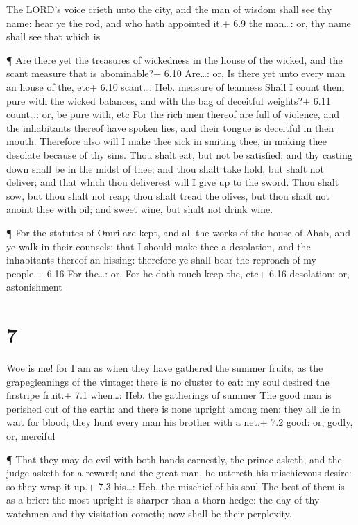  The LORD's voice crieth unto the city, and the man of
wisdom shall see thy name: hear ye the rod, and who hath appointed it.+
6.9 the man\ldots: or, thy name shall see that which is

 ¶ Are there yet the treasures of wickedness in the house
of the wicked, and the scant measure that is abominable?+ 6.10
Are\ldots: or, Is there yet unto every man an house of the, etc+ 6.10
scant\ldots: Heb. measure of leanness  Shall I count them
pure with the wicked balances, and with the bag of deceitful weights?+
6.11 count\ldots: or, be pure with, etc  For the rich men
thereof are full of violence, and the inhabitants thereof have spoken
lies, and their tongue is deceitful in their mouth. 
Therefore also will I make thee sick in smiting thee, in making thee
desolate because of thy sins.  Thou shalt eat, but not be
satisfied; and thy casting down shall be in the midst of thee; and thou
shalt take hold, but shalt not deliver; and that which thou deliverest
will I give up to the sword.  Thou shalt sow, but thou
shalt not reap; thou shalt tread the olives, but thou shalt not anoint
thee with oil; and sweet wine, but shalt not drink wine.

 ¶ For the statutes of Omri are kept, and all the works of
the house of Ahab, and ye walk in their counsels; that I should make
thee a desolation, and the inhabitants thereof an hissing: therefore ye
shall bear the reproach of my people.+ 6.16 For the\ldots: or, For he
doth much keep the, etc+ 6.16 desolation: or, astonishment

\hypertarget{section-6}{%
\section{7}\label{section-6}}

 Woe is me! for I am as when they have gathered the summer
fruits, as the grapegleanings of the vintage: there is no cluster to
eat: my soul desired the firstripe fruit.+ 7.1 when\ldots: Heb. the
gatherings of summer  The good man is perished out of the
earth: and there is none upright among men: they all lie in wait for
blood; they hunt every man his brother with a net.+ 7.2 good: or, godly,
or, merciful

 ¶ That they may do evil with both hands earnestly, the
prince asketh, and the judge asketh for a reward; and the great man, he
uttereth his mischievous desire: so they wrap it up.+ 7.3 his\ldots:
Heb. the mischief of his soul  The best of them is as a
brier: the most upright is sharper than a thorn hedge: the day of thy
watchmen and thy visitation cometh; now shall be their perplexity.

